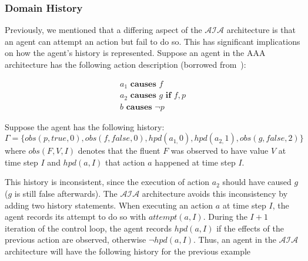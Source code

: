 \subsubsection{Domain History}
\label{subsubsec:domain_history}

Previously, we mentioned that a differing aspect of the $\mathcal{AIA}$ architecture is that an agent can attempt an action but fail to do so.
This has significant implications on how the agent's history is represented.
Suppose an agent in the AAA architecture has the following action description (borrowed from~\citep{blount_towards_2014}):

\begin{gather}
    a_1 \textbf{ causes } f \\
    a_2 \textbf{ causes } g \textbf{ if } f, p \\
    b \textbf{ causes } \neg p
\end{gather}

Suppose the agent has the following history\footnotemark:
\begin{equation}
    \Gamma=\{obs\left(p,true,0\right),obs\left(f,false,0\right),hpd\left(a_{1,}0\right),hpd\left(a_{2,}1\right),obs\left(g,false,2\right)\}
\end{equation}
where $obs(F, V, I)$ denotes that the fluent $F$ was observed to have value $V$ at time step $I$ and $hpd(a, I)$ that action $a$ happened at time step $I$.


This history is inconsistent, since the execution of action $a_2$ should have caused $g$ ($g$ is still false afterwards).
The $\mathcal{AIA}$ architecture avoids this inconsistency by adding two history statements.
When executing an action $a$ at time step $I$, the agent records its attempt to do so with $attempt(a, I)$.
During the $I+1$ iteration of the control loop, the agent records $hpd(a, I)$ if the effects of the previous action are observed, otherwise $\neg hpd(a, I)$.
Thus, an agent in the $\mathcal{AIA}$ architecture will have the following history for the previous example


